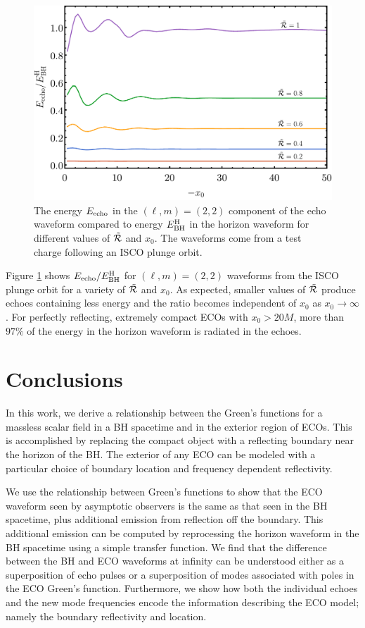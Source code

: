 \begin{refsection}
\begin{figure}[t]
\includegraphics[width = 1 \columnwidth]{chapter_echo/etc/EnergyPlot}
\caption{
The energy $E_{\rm echo}$ in the $(\ell,m)=(2,2) $ component of the echo waveform compared to energy $E_{\rm BH}^{\rm H}$ in the horizon waveform for different values of $\tilde{\mathcal R}$ and $x_0$.  The waveforms come from a test charge following an ISCO plunge orbit.
}
\label{fig:Energy}
\end{figure}

Figure \ref{fig:Energy} shows $E_{\rm echo}/E_{\rm BH}^{\rm H}$ for $(\ell, m)=(2,2)$ waveforms from the ISCO plunge orbit for a variety of $\tilde{\mathcal R}$ and $x_0$. As expected, smaller values of $\tilde{\mathcal R}$ produce echoes containing less energy and the ratio becomes independent of $x_0$ as $x_0\to \infty$. 
For perfectly reflecting, extremely compact ECOs with $x_0>20M$, more than $97\%$ of the energy in the horizon waveform is radiated in the echoes.


\section{Conclusions}

In this work, we derive a relationship between the Green's functions for a massless scalar field in a BH spacetime and in the exterior region of ECOs.
This is accomplished by replacing the compact object with a reflecting boundary near the horizon of the BH. 
The exterior of any ECO can be modeled with a particular choice of boundary location and frequency dependent reflectivity.

We use the relationship between Green's functions to show that the ECO waveform seen by asymptotic observers is the same as that seen in the BH spacetime, plus additional emission from reflection off the boundary.
This additional emission can be computed by reprocessing the horizon waveform in the BH spacetime using a simple transfer function.
We find that the difference between the BH and ECO waveforms at infinity can be understood either as a superposition of echo pulses or a superposition of modes associated with poles in the ECO Green's function. 
Furthermore, we show how both the individual echoes and the new mode frequencies encode the information describing the ECO model; namely the boundary reflectivity and location.


\end{refsection}
